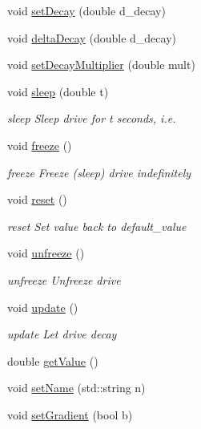 \begin{DoxyCompactItemize}
\item 
void \hyperlink{group__homeostasis_a1de29c1d81c42d9c5b9a982524df6f6a}{set\+Decay} (double d\+\_\+decay)
\item 
void \hyperlink{group__homeostasis_aca3acaf534b711dbfa953503b2880b5d}{delta\+Decay} (double d\+\_\+decay)
\item 
void \hyperlink{group__homeostasis_a7ae347b4d2b03d714fbfdbcc99a84b66}{set\+Decay\+Multiplier} (double mult)
\item 
void \hyperlink{group__homeostasis_a029792cdd31295e7b945ca4c0b2c5a73}{sleep} (double t)
\begin{DoxyCompactList}\small\item\em sleep Sleep drive for t seconds, i.\+e. \end{DoxyCompactList}\item 
void \hyperlink{group__homeostasis_a0e72e89b7ba3550d055eabf2106cb051}{freeze} ()
\begin{DoxyCompactList}\small\item\em freeze Freeze (sleep) drive indefinitely \end{DoxyCompactList}\item 
void \hyperlink{group__homeostasis_ad8a2a663703ad5eb93716b6917e2d68d}{reset} ()
\begin{DoxyCompactList}\small\item\em reset Set value back to default\+\_\+value \end{DoxyCompactList}\item 
void \hyperlink{group__homeostasis_a9ca7343cc59e73fc12daf01a95331794}{unfreeze} ()
\begin{DoxyCompactList}\small\item\em unfreeze Unfreeze drive \end{DoxyCompactList}\item 
void \hyperlink{group__homeostasis_af22888e6ca70ca223fe71abebd84d90b}{update} ()
\begin{DoxyCompactList}\small\item\em update Let drive decay \end{DoxyCompactList}\item 
double \hyperlink{group__homeostasis_a887538b6478fc6cc8d2e02856264e79f}{get\+Value} ()
\item 
void \hyperlink{group__homeostasis_a931a1c03efb3c846d317160739f34f7a}{set\+Name} (std\+::string n)
\item 
void \hyperlink{group__homeostasis_a63aa9044b470ef1d942edeab621b9019}{set\+Gradient} (bool b)
\end{DoxyCompactItemize}
